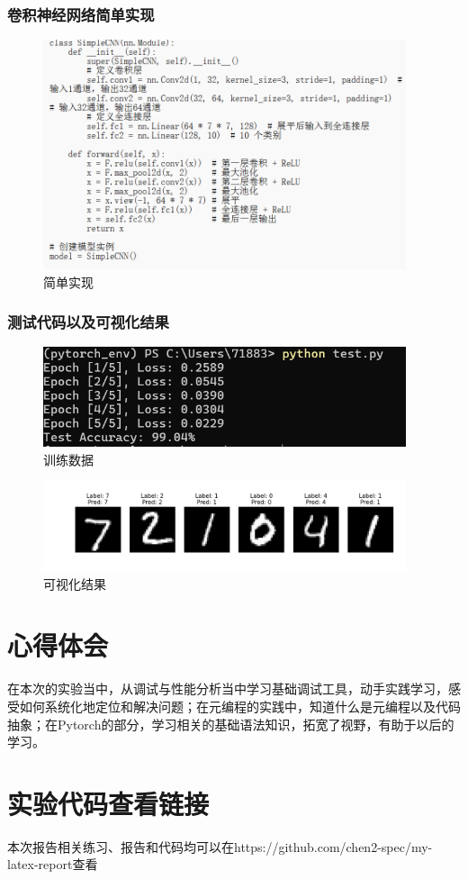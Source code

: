 \documentclass[UTF8]{ctexart}
\begin{document}
\subsubsection{卷积神经网络简单实现}
\begin{figure}[H]
    \centering
    \includegraphics[width=0.95\textwidth]{picture/卷积神经网络.png}%
    \caption{简单实现}
\end{figure}




\subsubsection{测试代码以及可视化结果}
\begin{figure}[H]
    \centering
    \includegraphics[width=0.95\textwidth]{picture/训练数据准确率.png}%
    \caption{训练数据}
\end{figure}
\begin{figure}[H]
    \centering
    \includegraphics[width=0.95\textwidth]{picture/可视化结构.png}%
    \caption{可视化结果}
\end{figure}
\section{心得体会}
在本次的实验当中，从调试与性能分析当中学习基础调试工具，动手实践学习，感受如何系统化地定位和解决问题；在元编程的实践中，知道什么是元编程以及代码抽象；在Pytorch的部分，学习相关的基础语法知识，拓宽了视野，有助于以后的学习。


\section{实验代码查看链接}
本次报告相关练习、报告和代码均可以在https://github.com/chen2-spec/my-latex-report查看
\end{document}
